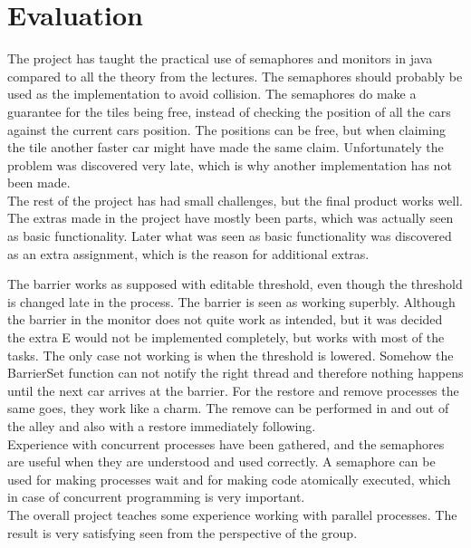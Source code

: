 \section{Evaluation}
The project has taught the practical use of semaphores and monitors in java compared to all the theory from the lectures. The semaphores should probably be used as the implementation to avoid collision. The semaphores do make a guarantee for the tiles being free, instead of checking the position of all the cars against the current cars position. The positions can be free, but when claiming the tile another faster car might have made the same claim. Unfortunately the problem was discovered very late, which is why another implementation has not been made.
\\

The rest of the project has had small challenges, but the final product works well. The extras made in the project have mostly been parts, which was actually seen as basic functionality. Later what was seen as basic functionality was discovered as an extra assignment, which is the reason for additional extras. 

The barrier works as supposed with editable threshold, even though the threshold is changed late in the process. The barrier is seen as working superbly. Although the barrier in the monitor does not quite work as intended, but it was decided the extra E would not be implemented completely, but works with most of the tasks. The only case not working is when the threshold is lowered. Somehow the BarrierSet function can not notify the right thread and therefore nothing happens until the next car arrives at the barrier. For the restore and remove processes the same goes, they work like a charm. The remove can be performed in and out of the alley and also with a restore immediately following.
\\

Experience with concurrent processes have been gathered, and the semaphores are useful when they are understood and used correctly. A semaphore can be used for making processes wait and for making code atomically executed, which in case of concurrent programming is very important.
\\

The overall project teaches some experience working with parallel processes. The result is very satisfying seen from the perspective of the group.